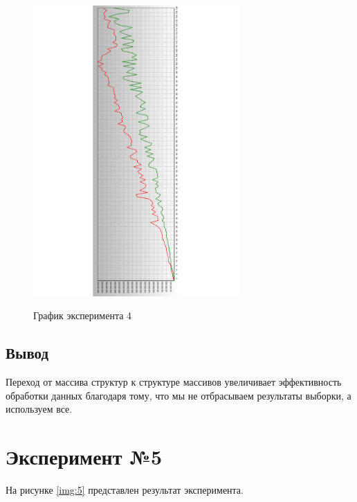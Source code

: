 \begin{figure}[H]
	\caption{График эксперимента 4}
	\includegraphics[width=0.7\textwidth, angle=90]{img/4.pdf}
	\label{img:4}
\end{figure}

\subsection*{Вывод}

Переход от массива структур к структуре массивов увеличивает эффективность обработки данных благодаря тому, что мы не отбрасываем результаты выборки, а используем все.

\section{Эксперимент №5}

На рисунке \ref{img:5} представлен результат эксперимента.

